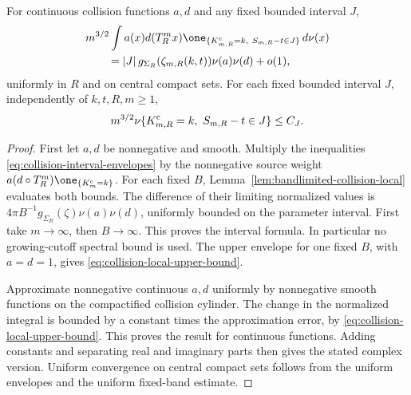 \begin{theorem}
\label{thm:two-endpoint-collision-LLT}
For continuous collision functions $a,d$ and any fixed bounded interval
$J$,
\begin{align}
 &m^{3/2}\int a(x)d(T_R^m x)
 \one_{\{K^{\rm c}_{m,R}=k,\ S_{m,R}-t\in J\}}\,d\nu(x)
 \notag\\
 &\qquad =|J|\,g_{\Sigma_R}(\zeta_{m,R}(k,t))\nu(a)\nu(d)+o(1),
 \label{eq:two-endpoint-collision-LLT}
\end{align}
uniformly in $R$ and on central compact sets. For each fixed bounded
interval $J$, independently of $k,t,R,m\ge1$,
\begin{equation}\label{eq:collision-local-upper-bound}
 m^{3/2}\nu\{K^{\rm c}_{m,R}=k,\ S_{m,R}-t\in J\}\le C_J.
\end{equation}
\end{theorem}
\begin{proof}
First let $a,d$ be nonnegative and smooth. Multiply the inequalities
\eqref{eq:collision-interval-envelopes} by the nonnegative source
weight $a(d\circ T_R^m)\one_{\{K_m^{\rm c}=k\}}$. For each fixed
$B$, Lemma~\ref{lem:bandlimited-collision-local} evaluates both bounds.
The difference of their limiting normalized values is
$4\pi B^{-1}g_{\Sigma_R}(\zeta)\nu(a)\nu(d)$, uniformly bounded
on the parameter interval. First take $m\to\infty$, then $B\to\infty$.
This proves the interval formula. In particular no growing-cutoff
spectral bound is used. The upper envelope for one fixed $B$, with
$a=d=1$, gives \eqref{eq:collision-local-upper-bound}.

Approximate nonnegative continuous $a,d$ uniformly by nonnegative
smooth functions on the compactified collision cylinder. The change
in the normalized integral is bounded by a constant times the
approximation error, by \eqref{eq:collision-local-upper-bound}.
This proves the result for continuous functions. Adding constants and
separating real and imaginary parts then gives the stated complex
version. Uniform convergence on central compact sets follows from the
uniform envelopes and the uniform fixed-band estimate.
\end{proof}

